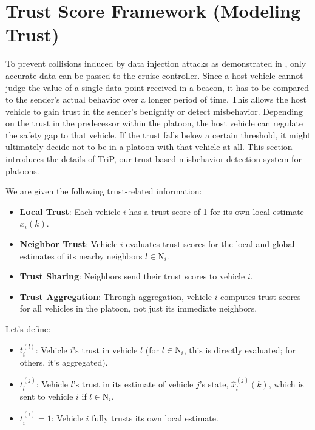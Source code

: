 \documentclass[letterpaper, 10pt, conference]{ieeeconf}  %
\begin{document}

\section{Trust Score Framework (Modeling Trust)}



To prevent collisions induced by data injection attacks as demonstrated in \cite{C_IDM}, only accurate data can be passed to the cruise controller. Since a host vehicle cannot judge the value of a single data point received in a beacon, it has to be compared to the sender's actual behavior over a longer period of time. This allows the host vehicle to gain trust in the sender's benignity or detect misbehavior. Depending on the trust in the predecessor within the platoon, the host vehicle can regulate the safety gap to that vehicle. If the trust falls below a certain threshold, it might ultimately decide not to be in a platoon with that vehicle at all. This section introduces the details of TriP, our trust-based misbehavior detection system for platoons.


We are given the following trust-related information:
\begin{itemize}
    \item \textbf{Local Trust}: Each vehicle \( i \) has a trust score of 1 for its own local estimate \( \bar{x}_i(k) \).
    \item \textbf{Neighbor Trust}: Vehicle \( i \) evaluates trust scores for the local and global estimates of its nearby neighbors \( l \in \mathrm{N}_i \).
    \item \textbf{Trust Sharing}: Neighbors send their trust scores to vehicle \( i \).
    \item \textbf{Trust Aggregation}: Through aggregation, vehicle \( i \) computes trust scores for all vehicles in the platoon, not just its immediate neighbors.
\end{itemize}

Let's define:
\begin{itemize}
    \item \( t_{i}^{(l)} \): Vehicle \( i \)'s trust in vehicle \( l \) (for \( l \in \mathrm{N}_i \), this is directly evaluated; for others, it's aggregated).
    \item \( t_{l}^{(j)} \): Vehicle \( l \)'s trust in its estimate of vehicle \( j \)'s state, \( \hat{x}_l^{(j)}(k) \), which is sent to vehicle \( i \) if \( l \in \mathrm{N}_i \).
    \item \( t_{i}^{(i)} = 1 \): Vehicle \( i \) fully trusts its own local estimate.
\end{itemize}
\end{document}
